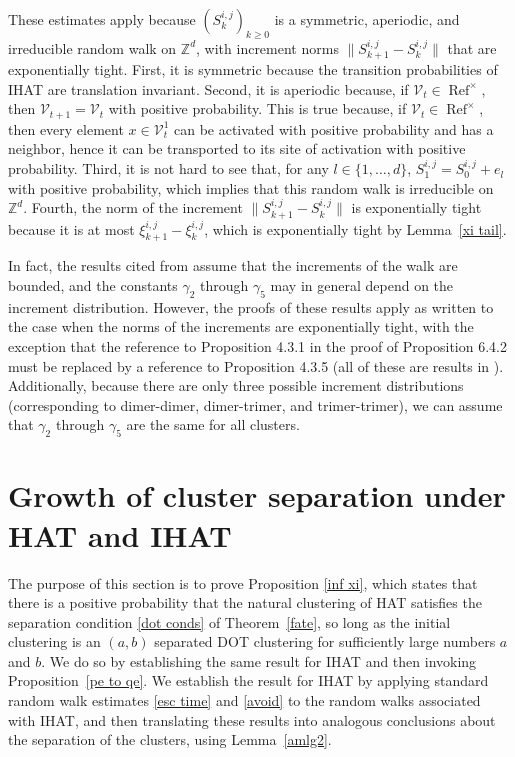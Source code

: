 \documentclass[11pt,reqno]{amsart}
\theoremstyle{definition}
\numberwithin{equation}{section}
\newcommand{\Z}{\mathbb{Z}}
\newcommand{\1}{\mathbf{1}}
\DeclareMathOperator{\Refcon}{\mathrm{Ref}}
\newcommand{\VV}{\mathcal{V}}
\begin{document}
These estimates apply because $(S_k^{i,j})_{k \geq 0}$ is a symmetric, aperiodic, and irreducible random walk on $\Z^d$, with increment norms $\|S_{k+1}^{i,j} - S_k^{i,j}\|$ that are exponentially tight. First, it is symmetric because the transition probabilities of IHAT are translation invariant. Second, it is aperiodic because, if $\VV_t \in \Refcon^\times$, then $\VV_{t+1} = \VV_t$ with positive probability. This is true because, if $\VV_t \in \Refcon^\times$, then every element $x \in \VV_t^1$ can be activated with positive probability and has a neighbor, hence it can be transported to its site of activation with positive probability. Third, it is not hard to see that, for any $l \in \{1,\dots,d\}$, $S_1^{i,j} = S_0^{i,j} + e_l$ with positive probability, which implies that this random walk is irreducible on $\Z^d$. Fourth, the norm of the increment $\|S_{k+1}^{i,j} - S_k^{i,j} \|$ is exponentially tight because it is at most $\xi_{k+1}^{i,j} - \xi_k^{i,j}$, which is exponentially tight by Lemma~\ref{xi tail}.

In fact, the results cited from \cite{lawler2010random} assume that the increments of the walk are bounded, and the constants $\gamma_2$ through $\gamma_5$ may in general depend on the increment distribution. However, the proofs of these results apply as written to the case when the norms of the increments are exponentially tight, with the exception that the reference to Proposition 4.3.1 in the proof of Proposition 6.4.2 must be replaced by a reference to Proposition 4.3.5 (all of these are results in \cite{lawler2010random}). Additionally, because there are only three possible increment distributions (corresponding to dimer-dimer, dimer-trimer, and trimer-trimer), we can assume that $\gamma_2$ through $\gamma_5$ are the same for all clusters.



\section{Growth of cluster separation under HAT and IHAT}\label{sec clust sep}

The purpose of this section is to prove Proposition \ref{inf xi}, which states that there is a positive probability that the natural clustering of HAT satisfies the separation condition \eqref{dot conds} of Theorem~\ref{fate}, so long as the initial clustering is an $(a,b)$ separated DOT clustering for sufficiently large numbers $a$ and $b$. We do so by establishing the same result for IHAT and then invoking Proposition~\ref{pe to qe}. We establish the result for IHAT by applying standard random walk estimates \eqref{esc time} and \eqref{avoid} to the random walks associated with IHAT, and then translating these results into analogous conclusions about the separation of the clusters, using Lemma~\ref{amlg2}.
\end{document}
